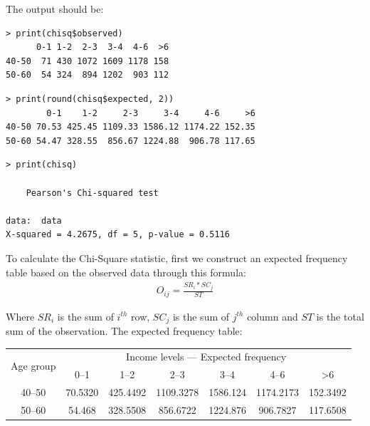 \documentclass[a4paper]{article}
\numberwithin{equation}{section}
\begin{document}
The output should be:
\begin{mdframed}[leftline=false,rightline=false,backgroundcolor=teal!10,nobreak=true]
  \begin{verbatim}
> print(chisq$observed)
      0-1 1-2  2-3  3-4  4-6  >6
40-50  71 430 1072 1609 1178 158
50-60  54 324  894 1202  903 112
  \end{verbatim}
  \begin{verbatim}
> print(round(chisq$expected, 2))
        0-1    1-2     2-3     3-4     4-6     >6
40-50 70.53 425.45 1109.33 1586.12 1174.22 152.35
50-60 54.47 328.55  856.67 1224.88  906.78 117.65
  \end{verbatim}
  \begin{verbatim}
> print(chisq)

	Pearson's Chi-squared test

data:  data
X-squared = 4.2675, df = 5, p-value = 0.5116
  \end{verbatim}
\end{mdframed}

To calculate the Chi-Square statistic, first we construct an expected frequency table based on the observed data through this formula:
\begin{align*}
  O_{ij} = \frac{SR_i * SC_j}{ST}
\end{align*}

Where \(SR_i\) is the sum of \(i^{th}\) row, \(SC_j\) is the sum of \(j^{th}\) column and \(ST\) is the total sum of the observation. The expected frequency table:
\begin{center}
  \begin{tabular}{ccccccc}
    \toprule
    \multirow{2}{*}{Age group} & \multicolumn{6}{c}{Income levels --- Expected frequency}                                                          \\
    \cmidrule(lr){2-7}
                               & 0--1                                                     & 1--2     & 2--3      & 3--4     & 4--6      & >6       \\
    \midrule
    40--50                     & 70.5320                                                  & 425.4492 & 1109.3278 & 1586.124 & 1174.2173 & 152.3492 \\
    50--60                     & 54.468                                                   & 328.5508 & 856.6722  & 1224.876 & 906.7827  & 117.6508 \\
    \bottomrule
  \end{tabular}
\end{center}
\end{document}
